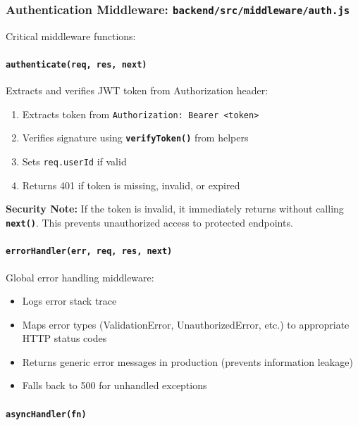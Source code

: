 \documentclass[12pt,a4paper,oneside]{article}
\newcommand{\fileref}[1]{\texttt{#1}}
\newcommand{\funcname}[1]{\texttt{\textbf{#1}}}
\newcommand{\varname}[1]{\texttt{#1}}
\begin{document}
\subsubsection{Authentication Middleware: \fileref{backend/src/middleware/auth.js}}

Critical middleware functions:

\paragraph{\funcname{authenticate(req, res, next)}}

Extracts and verifies JWT token from Authorization header:

\begin{enumerate}
    \item Extracts token from \texttt{Authorization: Bearer <token>}
    \item Verifies signature using \funcname{verifyToken()} from helpers
    \item Sets \varname{req.userId} if valid
    \item Returns 401 if token is missing, invalid, or expired
\end{enumerate}

\textbf{Security Note:} If the token is invalid, it immediately returns without calling \funcname{next()}. This prevents unauthorized access to protected endpoints.

\paragraph{\funcname{errorHandler(err, req, res, next)}}

Global error handling middleware:

\begin{itemize}
    \item Logs error stack trace
    \item Maps error types (ValidationError, UnauthorizedError, etc.) to appropriate HTTP status codes
    \item Returns generic error messages in production (prevents information leakage)
    \item Falls back to 500 for unhandled exceptions
\end{itemize}

\paragraph{\funcname{asyncHandler(fn)}}
\end{document}
